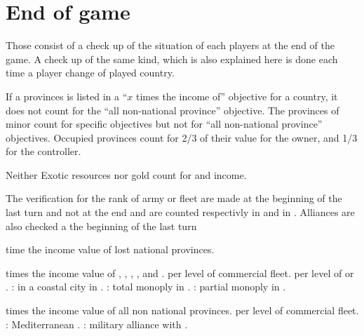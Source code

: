 

\section{End of game \VPs}\label{chVictories:End Game}

\aparag Those \VPs consist of a check up of the situation of each players at
the end of the game. A check up of the same kind, which is also explained here
is done each time a player change of played country.

\aparag If a provinces is listed in a ``$x$ times the income of'' objective
for a country, it does not count for the ``all non-national province''
objective.
\bparag The provinces of \VASSAL minor count for specific objectives but not
for ``all non-national province'' objectives.
\bparag Occupied provinces count for 2/3 of their value for the owner, and 1/3
for the controller.

\aparag Neither Exotic resources nor gold count for \COL and \TP income.

\aparag The verification for the rank of army or fleet are made at the
beginning of the last turn and not at the end and are counted respectivly in
\LD and in \NWD.
\aparag Alliances are also checked a the beginning of the last turn

 time the income value of lost national provinces.

 times the income value of ,
, , ,
and .
 \VP per level of commercial fleet.
 \VP per level of \COL or \TP.
 \VPs: \COL in a coastal city in .%
 \VPs: total monoply in .
 \VPs: partial monoply in .

 times the income value of all non national provinces.
 \VP per level of commercial fleet.
 \VPs: Mediterranean .
 \VPs: military alliance with .

